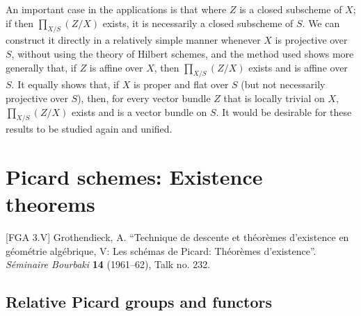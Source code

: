 \documentclass{article}
\newcommand{\oldpage}[1]{\marginpar{\footnotesize$\Big\vert$ \textit{p.~#1}}}
\theoremstyle{definition}
\theoremstyle{definition}
\theoremstyle{definition}
\theoremstyle{definition}
\theoremstyle{remark}
\begin{document}
An important case in the applications is that where \(Z\) is a closed subscheme of \(X\);
if then \(\prod_{X/S}(Z/X)\) exists, it is necessarily a closed subscheme of \(S\).
\oldpage{221-28}We can construct it directly in a relatively simple manner whenever \(X\) is projective over \(S\), without using the theory of Hilbert schemes, and the method used shows more generally that, if \(Z\) is affine over \(X\), then \(\prod_{X/S}(Z/X)\) exists and is affine over \(S\).
It equally shows that, if \(X\) is proper and flat over \(S\) (but not necessarily projective over \(S\)), then, for every vector bundle \(Z\) that is locally trivial on \(X\), \(\prod_{X/S}(Z/X)\) exists and is a vector bundle on \(S\).
It would be desirable for these results to be studied again and unified.

\hypertarget{fga-3.v}{%
\section{Picard schemes: Existence theorems}\label{fga-3.v}}

\providecommand{\scr}[1]{{\mathscr{#1}}}
\renewcommand{\cal}[1]{{\mathcal{#1}}}
\renewcommand{\frak}[1]{{\mathfrak{#1}}}
\renewcommand{\geq}{\geqslant}
\renewcommand{\leq}{\leqslant}

\providecommand{\Pic}{\operatorname{Pic}}
\providecommand{\shPic}{\mathscr{P}\kern -.5pt ic}
\providecommand{\repPic}{\underline{\Pic}}
\providecommand{\OO}{\scr{O}}
\providecommand{\RR}{\operatorname{R}}
\providecommand{\simto}{\xrightarrow{\sim}}
\providecommand{\HH}{\operatorname{H}}
\providecommand{\Sch}{\mathtt{Sch}}
\providecommand{\Hom}{\operatorname{Hom}}
\providecommand{\shHom}{\mathscr{H}\kern -.5pt om}
\providecommand{\from}{\leftarrow}
\providecommand{\pr}{\mathrm{pr}}
\providecommand{\div}{\operatorname{div}}
\providecommand{\Div}{\operatorname{Div}}
\providecommand{\shDiv}{\mathscr{D}\kern -.5pt iv}
\providecommand{\repDiv}{\underline{\Div}}
\providecommand{\Hilb}{\operatorname{Hilb}}
\providecommand{\shHilb}{\mathscr{H}\kern -.5pt ilb}
\providecommand{\repHilb}{\underline{\Hilb}}
\providecommand{\red}{\mathrm{red}}
\providecommand{\Spec}{\operatorname{Spec}}

{[}FGA 3.V{]}
Grothendieck, A.
``Technique de descente et théorèmes d'existence en géométrie algébrique, V: Les schémas de Picard: Théorèmes d'existence''.
\emph{Séminaire Bourbaki} \textbf{14} (1961--62), Talk no. 232.

\hypertarget{fga-3-v-section-1}{%
\subsection{Relative Picard groups and functors}\label{fga-3-v-section-1}}
\end{document}
